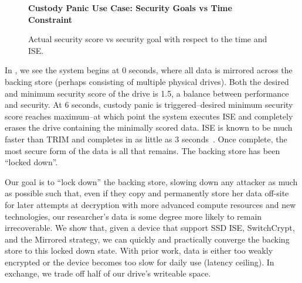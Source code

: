 \begin{figure}[ht] \textbf{Custody Panic Use Case: Security Goals vs Time
Constraint}\par\medskip
   \centering
   {} \caption{Actual security score vs
   security goal with respect to the time and ISE.}
  \label{fig:usecase-custody}
\end{figure}

In , we see the system begins at 0 seconds, where
all data is mirrored across the backing store (perhaps consisting of multiple
physical drives). Both the desired and minimum security score of the drive is
1.5, a balance between performance and security. At 6 seconds, custody panic is
triggered--desired minimum security score reaches maximum--at which point the
system executes ISE and completely erases the drive containing the minimally
scored data. ISE is known to be much faster than TRIM and completes in as little
as 3 seconds~\cite{SeaGate,Samsung,ThatOtherOEM}. Once complete, the most secure
form of the data is all that remains. The backing store has been ``locked
down''.

Our goal is to ``lock down'' the backing store, slowing down any attacker as
much as possible such that, even if they copy and permanently store her data
off-site for later attempts at decryption with more advanced compute resources
and new technologies, our researcher's data is some degree more likely to remain
irrecoverable. We show that, given a device that support SSD ISE, SwitchCrypt,
and the Mirrored strategy, we can quickly and practically converge the backing
store to this locked down state. With prior work, data is either too weakly
encrypted or the device becomes too slow for daily use (latency ceiling). In
exchange, we trade off half of our drive's writeable space.

